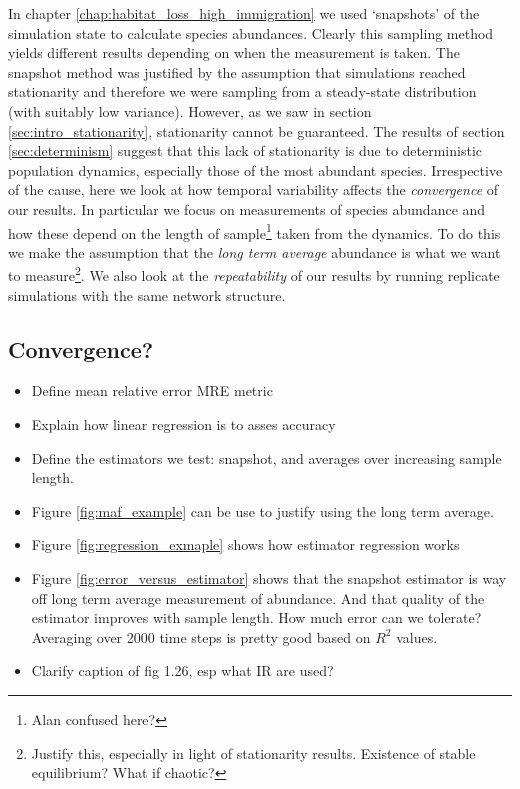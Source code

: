 In chapter \ref{chap:habitat_loss_high_immigration} we used  `snapshots' of the simulation state to calculate species abundances. Clearly this sampling method yields different results depending on when the measurement is taken. The snapshot method was justified by the assumption that simulations reached stationarity and therefore we were sampling from a steady-state distribution (with suitably low variance). However, as we saw in section \ref{sec:intro_stationarity}, stationarity cannot be guaranteed. The results of section \ref{sec:determinism} suggest that this lack of stationarity is due to deterministic population dynamics, especially those of the most abundant species. Irrespective of the cause, here we look at how temporal variability affects the \emph{convergence} of our results. In particular we focus on measurements of species abundance and how these depend on the length of sample\footnote{Alan confused here?} taken from the dynamics. To do this we make the assumption that the \emph{long term average} abundance is what we want to measure\footnote{Justify this, especially in light of stationarity results. Existence of stable equilibrium? What if chaotic?}. We also look at the \emph{repeatability} of our results by running replicate simulations with the same network structure.

\subsection{Convergence?}
%
%

\begin{itemize}
	\item Define mean relative error MRE metric
	\item Explain how linear regression is to asses accuracy
	\item Define the estimators we test: snapshot, and averages over increasing sample length. 
	\item Figure \ref{fig:maf_example} can be use to justify using the long term average.
	\item Figure \ref{fig:regression_exmaple} shows how estimator regression works
	\item Figure \ref{fig:error_versus_estimator} shows that the snapshot estimator is way off long term average measurement of abundance. And that quality of the estimator improves with sample length. How much error can we tolerate? Averaging over 2000 time steps is pretty good based on $R^2$ values.  
	\item Clarify caption of fig 1.26, esp what IR are used?
\end{itemize}


